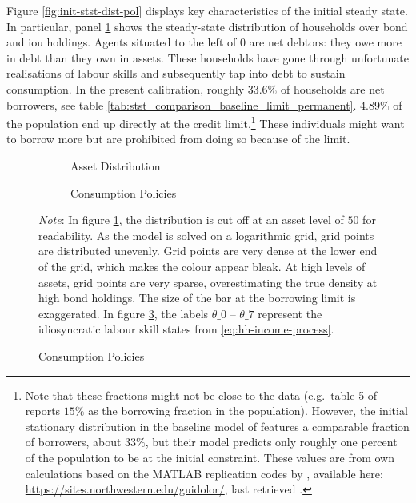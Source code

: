 \documentclass[a4paper,12pt]{article} %
\numberwithin{equation}{section} %
\numberwithin{figure}{section}
\numberwithin{table}{section}
\begin{document}
Figure \ref{fig:init-stst-dist-pol} displays key characteristics of the initial steady state. In particular, panel \ref{fig:init-stst-dist-pol-a-dist} shows the steady-state distribution of households over bond and \Gls{iou} holdings. Agents situated to the left of $0$ are net debtors: they owe more in debt than they own in assets. These households have gone through unfortunate realisations of labour skills and subsequently tap into debt to sustain consumption. In the present calibration, roughly $33.6\%$ of households are net borrowers, see table \ref{tab:stst_comparison_baseline_limit_permanent}. $4.89\%$ of the population end up directly at the credit limit.\footnote{Note that these fractions might not be close to the data (e.g.~table 5 of \cite[p.~722]{kaplan2018} reports $15\%$ as the borrowing fraction in the population). However, the initial stationary distribution in the baseline model of \textcite{gl2017} features a comparable fraction of borrowers, about $33\%$, but their model predicts only roughly one percent of the population to be at the initial constraint. These values are from own calculations based on the MATLAB replication codes by \textcite{gl2017}, available here: \url{https://sites.northwestern.edu/guidolor/}, last retrieved .} These individuals might want to borrow more but are prohibited from doing so because of the limit.

\begin{figure}[t]
    \caption{Baseline Model: Initial Steady State}
    \label{fig:init-stst-dist-pol}
    \centering
    \begin{subfigure}[b]{0.49\textwidth}
    \caption{Asset Distribution}
    \label{fig:init-stst-dist-pol-a-dist}
         \centering
         
     \end{subfigure}
     \hfill
     \begin{subfigure}[b]{0.49\textwidth}
     \caption{Consumption Policies}
     \label{fig:init-stst-dist-pol-c}
         \centering
         
     \end{subfigure}

    \vspace{10pt}
     
     \justifying
     \footnotesize
	\textit{Note}: In figure \ref{fig:init-stst-dist-pol-a-dist}, the distribution is cut off at an asset level of $50$ for readability. As the model is solved on a logarithmic grid, grid points are distributed unevenly. Grid points are very dense at the lower end of the grid, which makes the colour appear bleak. At high levels of assets, grid points are very sparse, overestimating the true density at high bond holdings. The size of the bar at the borrowing limit is exaggerated. In figure \ref{fig:init-stst-dist-pol-c}, the labels $\theta\_0$ -- $\theta\_7$ represent the idiosyncratic labour skill states from \eqref{eq:hh-income-process}.
\end{figure}
\end{document}
